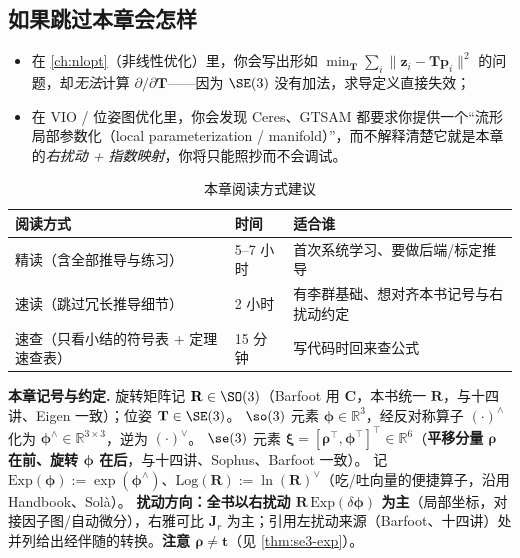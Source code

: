 \subsection*{如果跳过本章会怎样}
\begin{itemize}
  \item 在 \cref{ch:nlopt}（非线性优化）里，你会写出形如 $\min_{\mathbf{T}}\sum_i\|\mathbf{z}_i-\mathbf{T}\mathbf{p}_i\|^2$ 的问题，却\emph{无法}计算 $\partial/\partial\mathbf{T}$——因为 $\SE(3)$ 没有加法，求导定义直接失效；
  \item 在 VIO / 位姿图优化里，你会发现 Ceres、GTSAM 都要求你提供一个“流形局部参数化（local parameterization / manifold）”，而不解释清楚它就是本章的\emph{右扰动 + 指数映射}，你将只能照抄而不会调试。
\end{itemize}

\begin{table}[H]\centering\small
\caption{本章阅读方式建议}
\begin{tabular}{lll}
\toprule
阅读方式 & 时间 & 适合谁 \\
\midrule
精读（含全部推导与练习） & 5--7 小时 & 首次系统学习、要做后端/标定推导 \\
速读（跳过冗长推导细节） & 2 小时 & 有李群基础、想对齐本书记号与右扰动约定 \\
速查（只看小结的符号表 + 定理速查表） & 15 分钟 & 写代码时回来查公式 \\
\bottomrule
\end{tabular}
\end{table}

\begin{note}
\textbf{本章记号与约定.}\;
旋转矩阵记 $\mathbf{R}\in\SO(3)$（Barfoot\cite{barfoot2024state} 用 $\mathbf{C}$，本书统一 $\mathbf{R}$，与十四讲\cite{gaoxiang2019slam14}、Eigen 一致）；位姿 $\mathbf{T}\in\SE(3)$。
$\so(3)$ 元素 $\boldsymbol{\phi}\in\mathbb{R}^3$，经反对称算子 $(\cdot)^\wedge$ 化为 $\boldsymbol{\phi}^\wedge\in\mathbb{R}^{3\times3}$，逆为 $(\cdot)^\vee$。
$\se(3)$ 元素 $\boldsymbol{\xi}=[\boldsymbol{\rho}^\top,\boldsymbol{\phi}^\top]^\top\in\mathbb{R}^6$（\textbf{平移分量 $\boldsymbol{\rho}$ 在前、旋转 $\boldsymbol{\phi}$ 在后}，与十四讲、Sophus、Barfoot 一致）。
记 $\mathrm{Exp}(\boldsymbol{\phi}):=\exp(\boldsymbol{\phi}^\wedge)$、$\mathrm{Log}(\mathbf{R}):=\ln(\mathbf{R})^\vee$（吃/吐向量的便捷算子，沿用 Handbook\cite{carlone2026handbook}、Solà\cite{sola2018micro}）。
\textbf{扰动方向：全书以右扰动 $\mathbf{R}\,\mathrm{Exp}(\delta\boldsymbol{\phi})$ 为主}（局部坐标，对接因子图/自动微分），右雅可比 $\mathbf{J}_r$ 为主；引用左扰动来源（Barfoot、十四讲）处并列给出经伴随的转换。\textbf{注意 $\boldsymbol{\rho}\neq\mathbf{t}$}（见 \cref{thm:se3-exp}）。
\end{note}

